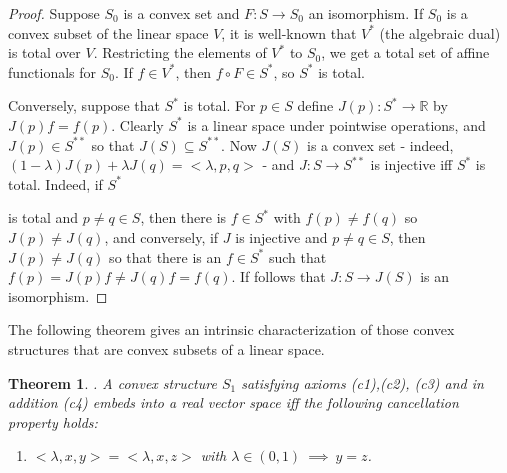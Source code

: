 \documentclass[12pt,letterpaper]{article}
\newtheorem{theorem}[lemma]{Theorem}
\begin{document}
\begin{proof} Suppose $S_0$ is a convex set and $F:S\to S_0$ an isomorphism. If $S_0$ is a convex subset of the linear space $V$, it is well-known that $V^*$ (the algebraic dual)
is total over $V$. Restricting the elements of $V^*$ to $S_0$, we get a total set of affine functionals for $S_0$. If $f\in V^*$, then $f\circ F\in S^*$, so $S^*$ is total.

Conversely, suppose that $S^*$ is total. For $p\in S$ define $J(p):S^*\to {\mathbb R}$ by $J(p)f=f(p)$. Clearly $S^*$ is a linear space under pointwise operations, and $J(p)\in S^{**}$ so that $J(S)\subseteq S^{**}$. Now $J(S)$ is a convex set - indeed, $(1-\lambda )J(p)+\lambda J(q)=<\lambda, p,q>$ -  and $J:S \to S^{**}$ is injective iff $S^*$ is total. Indeed, if $S^*$

is total and $p\neq q \in S$, then there is $f\in S^*$ with $f(p)\ne f(q)$ so $J(p)\neq J(q)$, and conversely, if $J$ is injective and $p\neq q\in S$,  then $J(p)\neq J(q)$ so that there is an $f\in S^*$ such that $f(p)=J(p)f\neq J(q)f= f(q)$. If follows that $J:S \to J(S)$ is an isomorphism.
\end{proof}

The following theorem gives an intrinsic characterization of those convex structures that are convex subsets of a linear space.

\begin{theorem}\label{th:intrinsic} \cite{S,CF}. A convex structure $S_1$  satisfying axioms \rm{(c1),(c2), (c3)} and in addition \rm{(c4)} embeds into a real vector space
iff the following cancellation property holds:
\begin{enumerate}
\item[(c5)] $<\lambda,x,y>=<\lambda,x,z>$ with $\lambda \in (0,1) \ \implies \ y=z$.
\end{enumerate}
\end{theorem}
\end{document}
